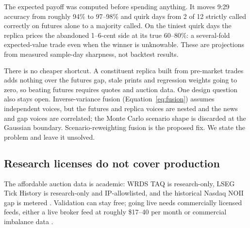 The expected payoff was computed before spending anything. It moves 9:29
accuracy from roughly 94\% to 97--98\% and quirk days from 2 of 12
strictly called correctly on futures alone to a majority called. On the
tiniest quirk days the replica prices the abandoned 1--6-cent side at its
true 60--80\%: a several-fold expected-value trade even when the winner
is unknowable. These are projections from measured sample-day sharpness,
not backtest results.

There is no cheaper shortcut. A constituent replica built from pre-market
trades adds nothing over the futures gap, stale prints and regression
weights going to zero, so beating futures requires quotes and auction
data. One design question also stays open. Inverse-variance fusion
(Equation~\ref{eq:fusion}) assumes independent voices, but the futures
and replica voices are nested
and the news and gap voices are correlated; the Monte Carlo scenario
shape is discarded at the Gaussian boundary. Scenario-reweighting fusion
is the proposed fix. We state the problem and leave it unsolved.

\subsection{Research licenses do not cover production}
\label{app:replica_licenses}

The affordable
auction data is academic: WRDS TAQ \citep{wrds2026taq} is
research-only, LSEG Tick History \citep{lseg2026tickhistory} is
research-only and IP-allowlisted, and the historical Nasdaq NOII gap is
metered \citep{databento2026equities}. Validation can stay free;
going live needs commercially licensed feeds, either a live broker feed at
roughly \$17--40 per month or commercial imbalance data
\citep{nyse2026taqimbalances}.
